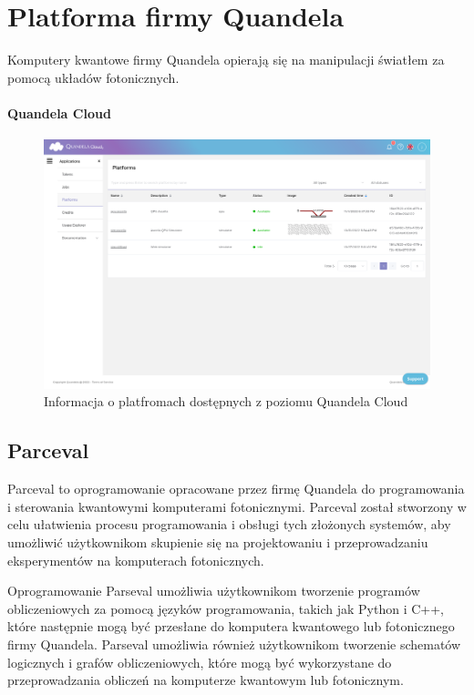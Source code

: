 \documentclass[a4paper,12pt
]{article}
\begin{document}
\hypertarget{platforma-firmy-quandela}{%
\section{Platforma firmy
Quandela}\label{platforma-firmy-quandela}}

Komputery kwantowe firmy Quandela opierają się na manipulacji światłem
za pomocą układów fotonicznych.

\hypertarget{quandela-cloud}{%
\paragraph{Quandela Cloud}\label{quandela-cloud}}

\begin{figure}
\centering
\includegraphics{Quandela-IDE-Platforms.png}
\caption{Informacja o platfromach dostępnych z poziomu Quandela Cloud}
\end{figure}

\hypertarget{parceval}{%
\subsection{Parceval}\label{parceval}}

Parceval to oprogramowanie opracowane przez firmę Quandela do
programowania i sterowania kwantowymi komputerami fotonicznymi.
Parceval został stworzony w celu ułatwienia procesu programowania i
obsługi tych złożonych systemów, aby umożliwić użytkownikom skupienie
się na projektowaniu i przeprowadzaniu eksperymentów na komputerach
fotonicznych.

Oprogramowanie Parseval umożliwia użytkownikom tworzenie programów
obliczeniowych za pomocą języków programowania, takich jak Python i C++,
które następnie mogą być przesłane do komputera kwantowego lub
fotonicznego firmy Quandela. Parseval umożliwia również użytkownikom
tworzenie schematów logicznych i grafów obliczeniowych, które mogą być
wykorzystane do przeprowadzania obliczeń na komputerze kwantowym lub
fotonicznym.
\end{document}
